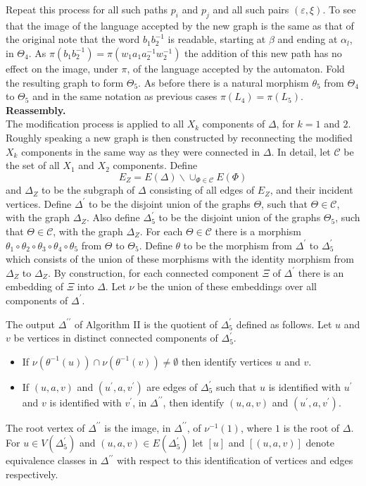 \documentclass[a4paper,12pt]{article}
\renewcommand{\a}{\alpha }
\renewcommand{\b}{\beta }
\newcommand{\D}{\Delta }
\newcommand{\e}{\varepsilon }
\newcommand{\T}{\Theta }
\newcommand{\nul}{\emptyset }
\numberwithin{equation}{section}
\numberwithin{figure}{section}
\newcommand{\cC}{\mathcal{C}}
\newcommand{\bs}{\backslash}
\begin{document}
Repeat this process for all such paths $p_i$ and $p_j$ and all such
pairs $(\e,\xi)$.
To see that the image of the language accepted by
 the new graph is the same as that of the original note
that the word $b_1b_2^{-1}$ is readable, starting at $\b$ and
ending at $\a_l$, in $\T_4$. As $\pi(b_1b_2^{-1})=\pi(w_1a_1a_2^{-1}w_2^{-1})$
the addition of this new path has no effect on the image, under $\pi$, of
the language accepted by the automaton.
 Fold the resulting graph to form $\T_5$. As before there is a natural
morphism $\theta_5$ from $\T_4$ to $\T_5$ and in the same notation
as previous cases $\pi(L_4)=\pi(L_5)$.\\[1em]

\noindent\textbf{Reassembly.}\\
The modification process is applied to all $X_k$ components of $\D$,
for $k=1$ and $2$. Roughly speaking a new graph is then constructed by
reconnecting the modified $X_k$ components in the same way as they
were connected in $\D$. In detail,
let $\cC$ be the set of all
$X_1$ and $X_2$ components.
Define
\[E_Z=E(\D)\bs \cup_{\Phi\in \cC} E(\Phi)\]
and $\D_Z$ to be the subgraph of $\D$ consisting of all edges
of $E_Z$, and their incident vertices.
Define $\D^\prime$ to be the disjoint union of the
 graphs $\T$, such that $\T\in \cC$, with  the graph $\D_Z$.
Also define $\D^{\prime}_5$ to be the disjoint union of the graphs
$\T_5$, such that $\T\in \cC$, with the graph $\D_Z$. For each
$\T\in \cC$ there is  a morphism
$\theta_1\circ\theta_2\circ\theta_3\circ\theta_4\circ\theta_5$
from $\T$ to $\T_5$. Define $\theta$ to be the morphism from
$\D^\prime$ to $\D^\prime_5$ which consists of the union of these
morphisms with the identity morphism from $\D_Z$ to $\D_Z$. By
construction, for each connected component $\Xi$ of $\D^\prime$
there is an embedding of $\Xi$ into $\D$. Let $\nu$ be the union
of these embeddings over all components of $\D^\prime$.

The output $\D^{\prime\prime}$  of Algorithm II is the quotient of
 $\D^\prime_5$ defined as follows.
Let $u$ and $v$ be vertices in
distinct connected components of $\D^\prime_5$.
\begin{itemize}
\item If $\nu(\theta^{-1}(u))\cap \nu(\theta^{-1}(v))\neq \nul$ then
identify vertices $u$ and $v$.
\item If $(u,a,v)$ and $(u^\prime, a, v^\prime)$ are edges
of $\D^\prime_5$ such that $u$ is identified with $u^\prime$ and
$v$ is identified with $v^\prime$, in $\D^{\prime\prime}$, then
identify  $(u,a,v)$ and $(u^\prime, a, v^\prime)$.
\end{itemize}
The root vertex of $\D^{\prime\prime}$ is the image, in
$\D^{\prime\prime}$, of $\nu^{-1}(1)$, where $1$ is  the root of
$\D$.
For $u \in V(\D^\prime_5)$ and $(u,a,v) \in E(\D^\prime_5)$ let
$[u]$ and $[(u,a,v)]$ denote equivalence classes in
$\D^{\prime\prime}$ with respect to this identification of
vertices and edges respectively.
\end{document}
